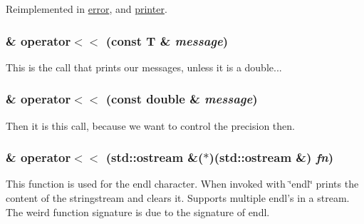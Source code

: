 Reimplemented in \hyperlink{classJKBuilder_1_1error_a7f207ac705d33a0cd9794a9f0b4a1fa0}{error}, and \hyperlink{classJKBuilder_1_1printer_a7f207ac705d33a0cd9794a9f0b4a1fa0}{printer}.\hypertarget{classJKBuilder_1_1IOManager_a505a35212a21e4884ed24b021c0add4b}{
\subsubsection[{operator$<$$<$}]{ \& operator$<$$<$ (const T \& {\em message})}}
\label{classJKBuilder_1_1IOManager_a505a35212a21e4884ed24b021c0add4b}


This is the call that prints our messages, unless it is a double... \hypertarget{classJKBuilder_1_1IOManager_a127779d1803b6ffe9e44a3a36e46910e}{
\subsubsection[{operator$<$$<$}]{ \& operator$<$$<$ (const double \& {\em message})}}
\label{classJKBuilder_1_1IOManager_a127779d1803b6ffe9e44a3a36e46910e}


Then it is this call, because we want to control the precision then. \hypertarget{classJKBuilder_1_1IOManager_a4ab394f377d37c6598659317320ec38c}{
\subsubsection[{operator$<$$<$}]{ \& operator$<$$<$ (std::ostream \&($\ast$)(std::ostream \&) {\em fn})}}
\label{classJKBuilder_1_1IOManager_a4ab394f377d37c6598659317320ec38c}


This function is used for the endl character. When invoked with \char`\"{}endl\char`\"{} prints the content of the stringstream and clears it. Supports multiple endl's in a stream. The weird function signature is due to the signature of endl. 

